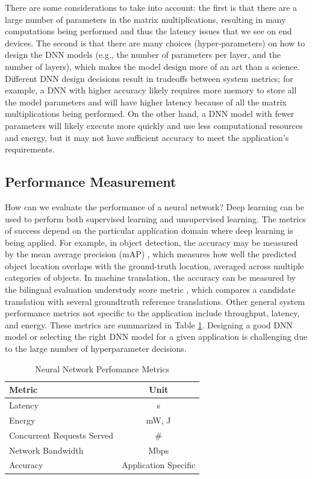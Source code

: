 There are some considerations to take into account: the first is that there are a large number of parameters in the matrix multiplications, resulting in many computations being performed and thus the latency issues that we see on end devices. The second is that there are many choices (hyper-parameters) on how to design the DNN models (e.g., the number of parameters per layer, and the number of layers), which makes the model design more of an art than a science. Different DNN design decisions result in tradeoffs between system metrics; for example, a DNN with higher accuracy likely requires more memory to store all the model parameters and will have higher latency because of all the matrix multiplications being performed. On the other hand, a DNN model with fewer parameters will likely execute more quickly and use less computational resources and energy, but it may not have sufficient accuracy to meet the application's requirements.


\subsection{Performance Measurement}
How can we evaluate the performance of a neural network?
Deep learning can be used to perform both supervised learning and unsupervised learning. The metrics of success depend on the particular application domain where deep learning is being applied. For example, in object detection, the accuracy may be measured by the mean average precision (mAP) \cite{ILSVRC15}, which measures how well the predicted object location overlaps with the ground-truth location, averaged across multiple categories of objects. In machine translation, the accuracy can be measured by the bilingual evaluation understudy score metric \cite{10.3115/1073083.1073135}, which compares a candidate translation with several groundtruth reference translations. 
Other general system performance metrics not specific to the application include throughput, latency, and energy. These metrics are summarized in Table \ref{tab:NN-Perfomance-Metrics}.
Designing a good DNN model or selecting the right DNN model for a given application is challenging due to the large number of hyperparameter decisions.

\begin{table}[htbp]
	\centering
	\begin{tabular}{|l||c|} 
	\hline 
	 Metric & Unit	\\
	\hline
	Latency  &	s	\\
	Energy	& mW, J	\\
	Concurrent Requests Served	&	\#  \\
	Network Bandwidth	& Mbps			  \\
	Accuracy & Application Specific		\\
	\hline
	\end{tabular}
	\caption{Neural Network Perfomance Metrics\label{tab:NN-Perfomance-Metrics}}
\end{table}

